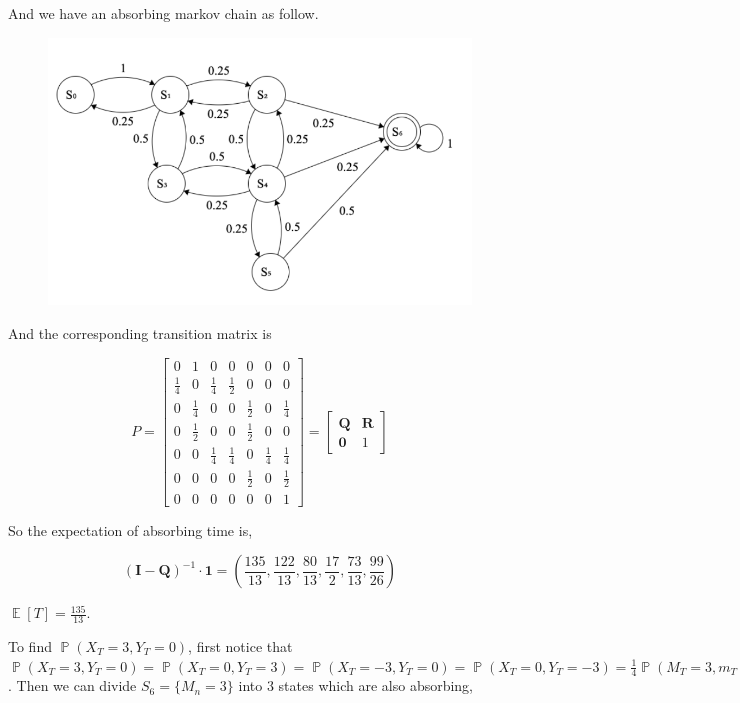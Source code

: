 \documentclass{article}
\DeclareMathOperator{\E}{\mathbb{E}}
\DeclareMathOperator{\bP}{\mathbb{P}}
\begin{document}
And we have an absorbing markov chain as follow.
\begin{figure}[!htbp]
    \centering
    \includegraphics[width=0.5\linewidth]{fsm.png}
\end{figure}  

And the corresponding transition matrix is 

\begin{equation}
    P = \begin{bmatrix}
         0& 1 & 0 & 0 & 0 & 0 & 0 \\
         \frac{1}{4} & 0 & \frac{1}{4}  & \frac{1}{2} & 0 & 0 & 0 \\
         0 & \frac{1}{4} & 0 &0 & \frac{1}{2} & 0 & \frac{1}{4} \\
         0 & \frac{1}{2} & 0 & 0 & \frac{1}{2} & 0 & 0 \\
         0 & 0 & \frac{1}{4} & \frac{1}{4} & 0 & \frac{1}{4} & \frac{1}{4} \\
         0 & 0&0&0  &\frac{1}{2} & 0 & \frac{1}{2} \\
         0&0&0&0&0&0&1 
    \end{bmatrix} = \begin{bmatrix}
        \boldsymbol{Q} &  \boldsymbol{R} \\
        \boldsymbol{0} & 1
    \end{bmatrix}
\end{equation}

So the expectation of absorbing time is,

\begin{equation}
    (\boldsymbol{I}-\boldsymbol{Q})^{-1}\cdot \boldsymbol{1} = (\frac{135}{13},\frac{122}{13},\frac{80}{13},\frac{17}{2},\frac{73}{13},\frac{99}{26})
\end{equation}

$\E[T] = \frac{135}{13}$.

To find $\bP(X_T = 3,Y_T=0)$, first notice that $\bP(X_T=3,Y_T=0) = \bP(X_T=0,Y_T=3) = \bP(X_T=-3,Y_T=0) =\bP(X_T=0,Y_T=-3) = \frac{1}{4} \bP(M_T=3,m_T=0)$. Then we can divide $S_6= \{M_n= 3\}$ into $3$ states which are also absorbing,
\end{document}
